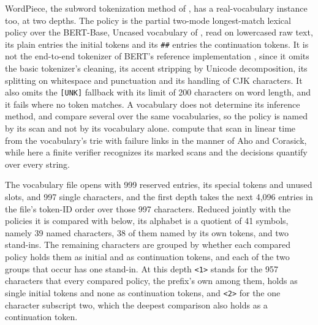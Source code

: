 \documentclass[11pt,a4paper]{article}
\theoremstyle{definition}
\theoremstyle{plain}
\newcommand{\code}[1]{\texttt{#1}}
\begin{document}
WordPiece, the subword tokenization method of \citet{schuster2012japanese}, has a real-vocabulary instance too, at two
depths. The policy is the partial two-mode longest-match lexical policy over the BERT-Base, Uncased vocabulary of
\citet{devlin2019bert}, read on lowercased raw text, its plain entries the initial tokens and its \code{\#\#} entries
the continuation tokens. It is not the end-to-end tokenizer of BERT's reference implementation \citep{bertcode}, since
it omits the basic tokenizer's cleaning, its accent stripping by Unicode decomposition, its splitting on whitespace and
punctuation and its handling of CJK characters. It also omits the \code{[UNK]} fallback with its limit of 200 characters
on word length, and it fails where no token matches. A vocabulary does not determine its inference method, and
\citet{uzan2024greed} compare several over the same vocabularies, so the policy is named by its scan and not by its
vocabulary alone. \citet{song2021fast} compute that scan in linear time from the vocabulary's trie with failure links in
the manner of Aho and Corasick, while here a finite verifier recognizes its marked scans and the decisions quantify over
every string.

The vocabulary file opens with 999 reserved entries, its special tokens and unused slots, and 997 single characters, and
the first depth takes the next 4{,}096 entries in the file's token-ID order over those 997 characters. Reduced jointly
with the policies it is compared with below, its alphabet is a quotient of 41 symbols, namely 39 named characters, 38 of
them named by its own tokens, and two stand-ins. The remaining characters are grouped by whether each compared policy
holds them as initial and as continuation tokens, and each of the two groups that occur has one stand-in. At this depth
\code{<1>} stands for the 957 characters that every compared policy, the prefix's own among them, holds as single
initial tokens and none as continuation tokens, and \code{<2>} for the one character subscript two, which the deepest
comparison also holds as a continuation token.
\end{document}
